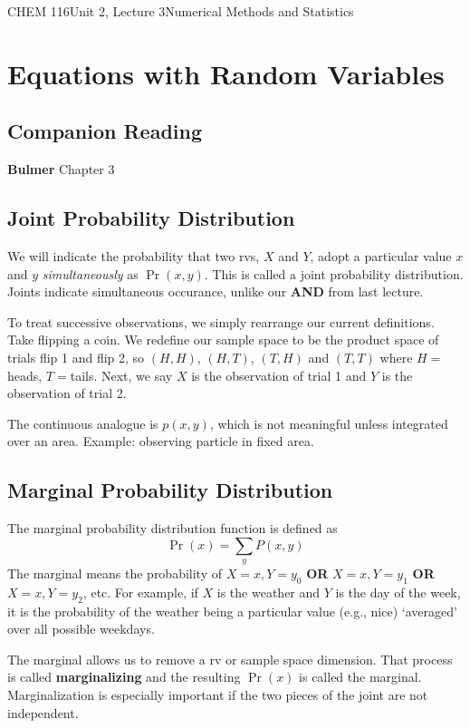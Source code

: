 \documentclass{article}
\begin{document}
\begin{tdoc}{CHEM 116}{Unit 2, Lecture 3}{Numerical Methods and Statistics}

  \section{Equations with Random Variables}

  \subsection*{Companion Reading}
  \textbf{Bulmer} Chapter 3

\subsection{Joint Probability Distribution}
We will indicate the probability that two rvs, $X$ and $Y$, adopt a
particular value $x$ and $y$ \emph{simultaneously} as $\Pr(x,y)$. This
is called a joint probability distribution. Joints indicate
simultaneous occurance, unlike our {\bf AND} from last lecture.

To treat successive observations, we simply rearrange our current
definitions. Take flipping a coin. We redefine our sample space to be
the product space of trials flip 1 and flip 2, so $(H,H)$, $(H,T)$,
$(T,H)$ and $(T,T)$ where $H=$heads, $T=$tails. Next, we say $X$ is the
observation of trial 1 and $Y$ is the observation of trial 2.

The continuous analogue is $p(x,y)$, which is not meaningful unless
integrated over an area. Example: observing particle in fixed area.

\subsection{Marginal Probability Distribution}
The marginal probability distribution function is defined as
\begin{equation}
\Pr(x) = \sum_y P(x,y)
\end{equation}
The marginal means the probability of $X=x, Y=y_0$ \textbf{OR} $X=x, Y=y_1$ \textbf{OR}
$X=x, Y=y_2$, etc. For example, if $X$ is the weather and $Y$ is the
day of the week, it is the probability of the weather being a particular value (e.g., nice) `averaged' over
all possible weekdays.

The marginal allows us to remove a rv or sample space dimension. That
process is called {\bf marginalizing} and the resulting $\Pr(x)$ is
called the marginal. Marginalization is especially important if the two pieces of
the joint are not independent.


\end{tdoc}
\end{document}
